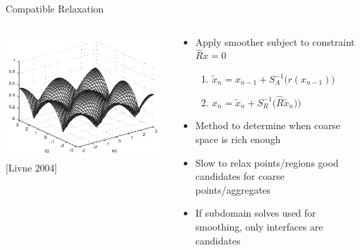 \documentclass{beamer}
\begin{document}
\begin{frame}{Compatible Relaxation}
  \begin{columns}
    \begin{column}{0.5\textwidth}
      \includegraphics[width=\textwidth]{figures/LivneHabituatedCR} \\
      {\small [Livne 2004]}
    \end{column}
    \begin{column}{0.5\textwidth}
      \begin{itemize}
      \item Apply smoother subject to constraint $\hat R x = 0$
        \begin{enumerate}
        \item $\tilde x_n = x_{n-1} + S_A^{-1}\big(r(x_{n-1}) \big)$
        \item $x_n = \tilde x_n + S_R^{-1}\big(\hat R\tilde x_n) \big)$
        \end{enumerate}
      \item Method to determine when coarse space is rich enough
      \item Slow to relax points/regions good candidates for coarse points/aggregates
      \item If subdomain solves used for smoothing, only interfaces are candidates
      \end{itemize}
    \end{column}
  \end{columns}
\end{frame}
\end{document}
